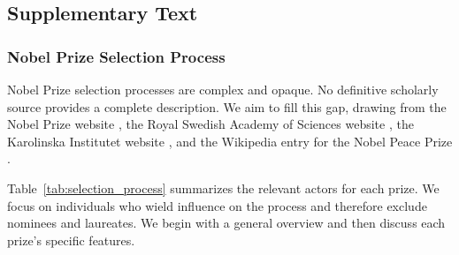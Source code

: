 \documentclass[12pt]{article}
\begin{document}
\clearpage

\subsection*{Supplementary Text}

\subsubsection*{Nobel Prize Selection Process}

Nobel Prize selection processes are complex and opaque. No definitive scholarly source provides a complete description. We aim to fill this gap, drawing from the Nobel Prize website \cite{NobelPrizeWebsiteFull}, the Royal Swedish Academy of Sciences website \cite{RSAS}, the Karolinska Institutet website \cite{KINA}, and the Wikipedia entry for the Nobel Peace Prize \cite{NPPWiki}.

Table~\ref{tab:selection_process} summarizes the relevant actors for each prize. We focus on individuals who wield influence on the process and therefore exclude nominees and laureates. We begin with a general overview and then discuss each prize's specific features.
\end{document}
